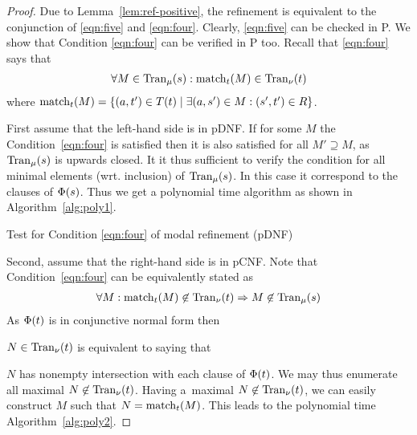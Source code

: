 \begin{proof}
Due to Lemma~\ref{lem:ref-positive}, the refinement is equivalent to the
conjunction of \eqref{eqn:five} and \eqref{eqn:four}. Clearly, \eqref{eqn:five} can be checked in P. 
We show that Condition \eqref{eqn:four} can be verified in P too.
Recall 
that \eqref{eqn:four}  says that
\begin{align*}
 \forall M \in \mathrm{Tran}_\mu(s) : \mathrm{match}_t(M) \in \mathrm{Tran}_\nu(t) 
\end{align*}
where $\mathrm{match}_t(M) = \{ (a,t') \in T(t) \mid \exists (a,s') \in M :
(s',t') \in R\}$.

First assume that the left-hand side is in pDNF.
If for some $M$ the Condition~\eqref{eqn:four}  
is satisfied then it is also
satisfied for all $M' \supseteq M$, as $\mathrm{Tran}_{\mu}(s)$ is upwards closed.
It it thus sufficient to verify the condition 
for all minimal elements (wrt. inclusion)
of $\mathrm{Tran}_{\mu}(s)$. In this case it correspond to the clauses of $\mathrm{\Phi}(s)$.
Thus we get a polynomial time algorithm as shown 
in Algorithm~\ref{alg:poly1}.

\begin{algorithm}[ht]

\;
\caption{Test for Condition \eqref{eqn:four} of modal 
refinement (pDNF) \label{alg:poly1}} 
\end{algorithm}

Second, assume that the right-hand side is in pCNF. 
Note that Condition~\eqref{eqn:four} can be equivalently stated as
\begin{align}
\forall M : \mathrm{match}_t(M) \not\in\mathrm{Tran}_\nu(t) \Rightarrow M \not\in \mathrm{Tran}_\mu(s) \label{eqn:fourEq}
\end{align}
As $\mathrm{\Phi}(t)$ is in conjunctive normal form then 

$N \in \mathrm{Tran}_\nu(t)$ is equivalent to saying that

$N$ has nonempty
intersection with each clause of $\mathrm{\Phi}(t)$. 
We may thus enumerate all maximal $N \not\in \mathrm{Tran}_\nu(t)$.
Having a~maximal $N \not\in \mathrm{Tran}_\nu(t)$, we 
can easily construct $M$ such that $N = \mathrm{match}_t(M)$.
This leads to the polynomial time Algorithm~\ref{alg:poly2}.


\end{proof}
